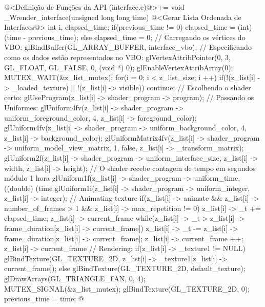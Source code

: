 \iniciocodigo
@<Definição de Funções da API (interface.c)@>+=
void _Wrender_interface(unsigned long long time){
  @<Gerar Lista Ordenada de Interfaces@>
  {
    int i, elapsed_time;
    if(previous_time != 0)
      elapsed_time = (int) (time - previous_time);
    else
      elapsed_time = 0;
    // Carregando os vértices do VBO:
    glBindBuffer(GL_ARRAY_BUFFER, interface_vbo);
    // Especificando como os dados estão representados no VBO:
    glVertexAttribPointer(0, 3, GL_FLOAT, GL_FALSE, 0,
                          (void *) 0);
    glEnableVertexAttribArray(0);
    MUTEX_WAIT(&z_list_mutex);
    for(i = 0; i < z_list_size; i ++){
      if(!(z_list[i] -> _loaded_texture) || !(z_list[i] -> visible))
        continue;
      // Escolhendo o shader certo:
      glUseProgram(z_list[i] -> shader_program -> program);
      // Passando os Uniformes:
      glUniform4fv(z_list[i] -> shader_program -> uniform_foreground_color, 4,
                   z_list[i] -> foreground_color);
      glUniform4fv(z_list[i] -> shader_program -> uniform_background_color, 4,
                   z_list[i] -> background_color);
      glUniformMatrix4fv(z_list[i] -> shader_program ->
                           uniform_model_view_matrix, 1, false,
                         z_list[i] -> _transform_matrix);
      glUniform2f(z_list[i] -> shader_program -> uniform_interface_size,
                  z_list[i] -> width, z_list[i] -> height);
      // O shader recebe contagem de tempo em segundos módulo 1 hora
      glUniform1f(z_list[i] -> shader_program -> uniform_time,
                  ((double) (time %
      glUniform1i(z_list[i] -> shader_program -> uniform_integer,
                 z_list[i] -> integer);
      // Animating texture
      if(z_list[i] -> animate && z_list[i] -> number_of_frames > 1 &&
         z_list[i] -> max_repetition != 0){
        z_list[i] -> _t += elapsed_time;
        z_list[i] -> current_frame %
        while(z_list[i] -> _t >
                     z_list[i] -> frame_duration[z_list[i] -> current_frame]){
          z_list[i] -> _t -=
            z_list[i] -> frame_duration[z_list[i] -> current_frame];
          z_list[i] -> current_frame ++;
          z_list[i] -> current_frame %
        }
      }
      // Rendering:
      if(z_list[i] -> _texture1 != NULL)
        glBindTexture(GL_TEXTURE_2D,
                      z_list[i] -> _texture1[z_list[i] -> current_frame]);
      else
        glBindTexture(GL_TEXTURE_2D, default_texture);
      glDrawArrays(GL_TRIANGLE_FAN, 0, 4);
    }
    MUTEX_SIGNAL(&z_list_mutex);
    glBindTexture(GL_TEXTURE_2D, 0);
  }
  previous_time = time;
}
@
\fimcodigo


